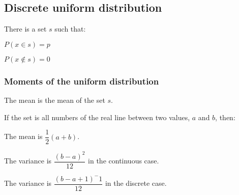
\subsection{Discrete uniform distribution}

There is a set \(s\) such that:

\(P(x\in s)=p\)

\(P(x\not\in s)=0\)

\subsubsection{Moments of the uniform distribution}

The mean is the mean of the set \(s\).

If the set is all numbers of the real line between two values, \(a\) and \(b\), then:

The mean is \(\dfrac{1}{2}(a+b)\).

The variance is \(\dfrac{(b-a)^2}{12}\) in the continuous case.

The variance is \(\dfrac{(b-a+1)^-1}{12}\) in the discrete case.

